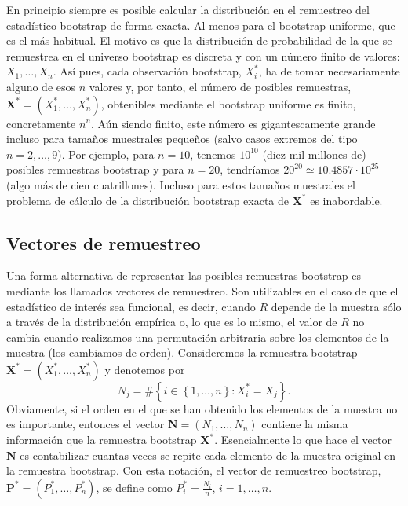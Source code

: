 \documentclass[
]{book}
\renewcommand{\mathbf}[1]{\symbf{#1}}
\theoremstyle{break}
\theoremstyle{nonumberplain}
\begin{document}
En principio siempre es posible calcular la distribución en el
remuestreo del estadístico bootstrap de forma exacta. Al menos para el
bootstrap uniforme, que es el más habitual. El motivo es que la
distribución de probabilidad de la que se remuestrea en el universo
bootstrap es discreta y con un número finito de valores: \(X_1,\ldots
,X_n\). Así pues, cada observación bootstrap, \(X_i^{\ast}\), ha de
tomar necesariamente alguno de esos \(n\) valores y, por tanto, el número
de posibles remuestras, \(\mathbf{X}^{\ast}=\left( X_1^{\ast
},\ldots ,X_n^{\ast} \right)\), obtenibles mediante el bootstrap
uniforme es finito, concretamente \(n^{n}\). Aún siendo finito, este
número es gigantescamente grande incluso para tamaños muestrales
pequeños (salvo casos extremos del tipo \(n=2,\ldots ,9\)). Por ejemplo,
para \(n=10\), tenemos \(10^{10}\) (diez mil millones de) posibles
remuestras bootstrap y para \(n=20\), tendríamos
\(20^{20}\simeq 10.4857\cdot 10^{25}\) (algo más de cien
cuatrillones). Incluso para estos tamaños muestrales el problema de
cálculo de la distribución bootstrap exacta de
\(\mathbf{X}^{\ast}\) es inabordable.

\subsection{Vectores de remuestreo}\label{vectores-de-remuestreo}

Una forma alternativa de representar las posibles remuestras bootstrap
es mediante los llamados vectores de remuestreo. Son utilizables en el
caso de que el estadístico de interés sea funcional, es decir, cuando
\(R\) depende de la muestra sólo a través de la distribución empírica o,
lo que es lo mismo, el valor de \(R\) no cambia cuando realizamos una
permutación arbitraria sobre los elementos de la muestra (los cambiamos
de orden). Consideremos la remuestra bootstrap
\(\mathbf{X}^{\ast}
=\left( X_1^{\ast},\ldots ,X_n^{\ast} \right)\) y denotemos por
\[N_j=\#\left\{ i\in \left\{ 1,\ldots ,n\right\} : 
X_i^{\ast}=X_j\right\}.\]
Obviamente, si el orden en el que se han obtenido los
elementos de la muestra no es importante, entonces el vector
\(\mathbf{N}=\left( N_1,\ldots ,N_n \right)\) contiene la misma
información que la remuestra bootstrap \(\mathbf{X}^{\ast}\).
Esencialmente lo que hace el vector \(\mathbf{N}\) es contabilizar
cuantas veces se repite cada elemento de la muestra original en la
remuestra bootstrap. Con esta notación, el vector de remuestreo
bootstrap,
\(\mathbf{P}^{\ast}=\left( P_1^{\ast},\ldots ,P_n^{\ast} \right)\),
se define como \(P_i^{\ast}=\frac{N_i}{n}\), \(i=1,\ldots ,n\).
\end{document}
